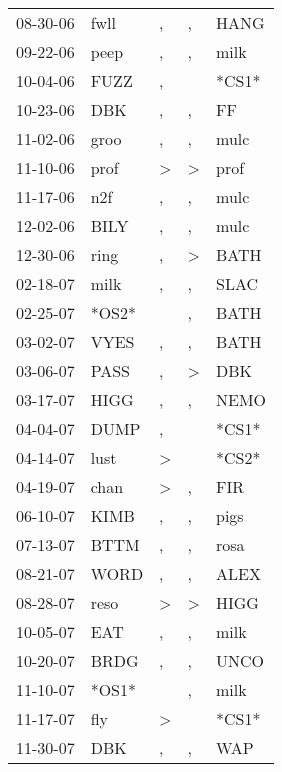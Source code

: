\begin{supertabular}{lllll}
 08-30-06 &   fwll &             , &             , &   HANG \\
 09-22-06 &   peep &             , &             , &   milk \\
 10-04-06 &   FUZZ &             , &               &  *CS1* \\
 10-23-06 &    DBK &             , &             , &     FF \\
 11-02-06 &   groo &             , &             , &   mulc \\
 11-10-06 &   prof &  \textgreater &  \textgreater &   prof \\
 11-17-06 &    n2f &             , &             , &   mulc \\
 12-02-06 &   BILY &             , &             , &   mulc \\
 12-30-06 &   ring &             , &  \textgreater &   BATH \\
 02-18-07 &   milk &             , &             , &   SLAC \\
 02-25-07 &  *OS2* &               &             , &   BATH \\
 03-02-07 &   VYES &             , &             , &   BATH \\
 03-06-07 &   PASS &             , &  \textgreater &    DBK \\
 03-17-07 &   HIGG &             , &             , &   NEMO \\
 04-04-07 &   DUMP &             , &               &  *CS1* \\
 04-14-07 &   lust &  \textgreater &               &  *CS2* \\
 04-19-07 &   chan &  \textgreater &             , &    FIR \\
 06-10-07 &   KIMB &             , &             , &   pigs \\
 07-13-07 &   BTTM &             , &             , &   rosa \\
 08-21-07 &   WORD &             , &             , &   ALEX \\
 08-28-07 &   reso &  \textgreater &  \textgreater &   HIGG \\
 10-05-07 &    EAT &             , &             , &   milk \\
 10-20-07 &   BRDG &             , &             , &   UNCO \\
 11-10-07 &  *OS1* &               &             , &   milk \\
 11-17-07 &    fly &  \textgreater &               &  *CS1* \\
 11-30-07 &    DBK &             , &             , &    WAP \\

\end{supertabular}
